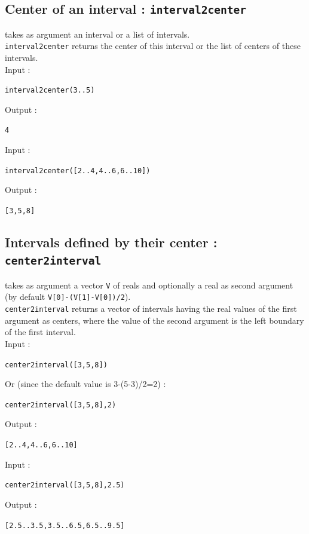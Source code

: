 \documentclass[a4paper,11pt]{book}
\begin{document}
\subsection{Center of an interval : {\tt interval2center}}
 takes as argument an interval or a list of
intervals.\\
{\tt interval2center} returns the center of this interval or the list of
centers of these intervals.\\
Input :
\begin{center}{\tt interval2center(3..5)}\end{center}
Output :
\begin{center}{\tt 4}\end{center}
Input :
\begin{center}{\tt interval2center([2..4,4..6,6..10])}\end{center}
Output :
\begin{center}{\tt [3,5,8]}\end{center}

\subsection{Intervals defined by their center : {\tt center2interval}}
 takes as argument a vector {\tt V} of reals
and optionally a real as second argument 
(by default {\tt V[0]-(V[1]-V[0])/2}).\\
{\tt center2interval} returns a vector of intervals having 
the real values of the first argument as centers, where
the value of the second argument is
the left boundary of the first interval.\\
Input :
\begin{center}{\tt center2interval([3,5,8])}\end{center}
Or (since the default value is 3-(5-3)/2=2) :
\begin{center}{\tt center2interval([3,5,8],2)}\end{center}
Output :
\begin{center}{\tt [2..4,4..6,6..10]}\end{center}
Input :
\begin{center}{\tt center2interval([3,5,8],2.5)}\end{center}
Output :
\begin{center}{\tt [2.5..3.5,3.5..6.5,6.5..9.5]}\end{center}
\end{document}
